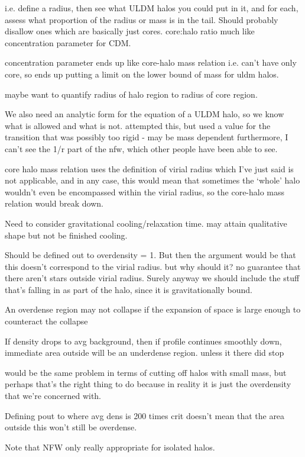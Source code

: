 \documentclass[a4paper,11pt]{article}
\begin{document}
i.e. define a radius, then see what ULDM halos you could put in it, and for each, assess what proportion of the radius or mass is in the tail. Should probably disallow ones which are basically just cores. core:halo ratio much like concentration parameter for CDM.

concentration parameter ends up like core-halo mass relation i.e. can't have only core, so ends up putting a limit on the lower bound of mass for uldm halos. 

maybe want to quantify radius of halo region to radius of core region. 

We also need an analytic form for the equation of a ULDM halo, so we know what is allowed and what is not. \cite{bullock} attempted this, but used a value for the transition that was possibly too rigid - may be mass dependent furthermore, I can't see the 1/r part of the nfw, which other people have been able to see. 

core halo mass relation uses the definition of virial radius which I've just said is not applicable, and in any case, this would mean that sometimes the `whole' halo wouldn't even be encompassed within the virial radius, so the core-halo mass relation would break down. 

Need to consider gravitational cooling/relaxation time. may attain qualitative shape but not be finished cooling. 

Should be defined out to overdensity = 1. But then the argument would be that this doesn't correspond to the virial radius. but why should it? no guarantee that there aren't stars outside virial radius. Surely anyway we should include the stuff that's falling in as part of the halo, since it is gravitationally bound. 

An overdense region may not collapse if the expansion of space is large enough to counteract the collapse


If density drops to avg background, then if profile continues smoothly down, immediate area outside will be an underdense region. unless it there did stop

would be the same problem in terms of cutting off halos with small mass, but perhaps that's the right thing to do because in reality it is just the overdensity that we're concerned with. 

Defining pout to where avg dens is 200 times crit doesn't mean that the area outside this won't still be overdense.

Note that NFW only really appropriate for isolated halos. 
\end{document}
